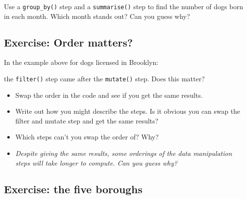 \documentclass[]{Nemilov}
\newenvironment{Shaded}{\begin{snugshade}}{\end{snugshade}}
\newcommand{\DataTypeTok}[1]{\textcolor[rgb]{0.13,0.29,0.53}{#1}}
\newcommand{\KeywordTok}[1]{\textcolor[rgb]{0.13,0.29,0.53}{\textbf{#1}}}
\newcommand{\NormalTok}[1]{#1}
\newcommand{\OperatorTok}[1]{\textcolor[rgb]{0.81,0.36,0.00}{\textbf{#1}}}
\newcommand{\StringTok}[1]{\textcolor[rgb]{0.31,0.60,0.02}{#1}}
\begin{document}
Use a \texttt{group\_by()} step and a \texttt{summarise()} step to find the number of dogs born in each month. Which month stands out? Can you guess why?

\hypertarget{exercise-order-matters}{%
\subsection{Exercise: Order matters?}\label{exercise-order-matters}}

In the example above for dogs licensed in Brooklyn:

\begin{Shaded}
\end{Shaded}

the \texttt{filter()} step came after the \texttt{mutate()} step. Does this matter?

\begin{itemize}
\item
  Swap the order in the code and see if you get the same results.
\item
  Write out how you might describe the steps. Is it obvious you can swap the filter and mutate step and get the same results?
\item
  Which steps can't you swap the order of? Why?
\item
  \emph{Despite giving the same results, some orderings of the data manipulation steps will take longer to compute. Can you guess why?}
\end{itemize}

\hypertarget{exercise-the-five-boroughs}{%
\subsection{Exercise: the five boroughs}\label{exercise-the-five-boroughs}}
\end{document}
